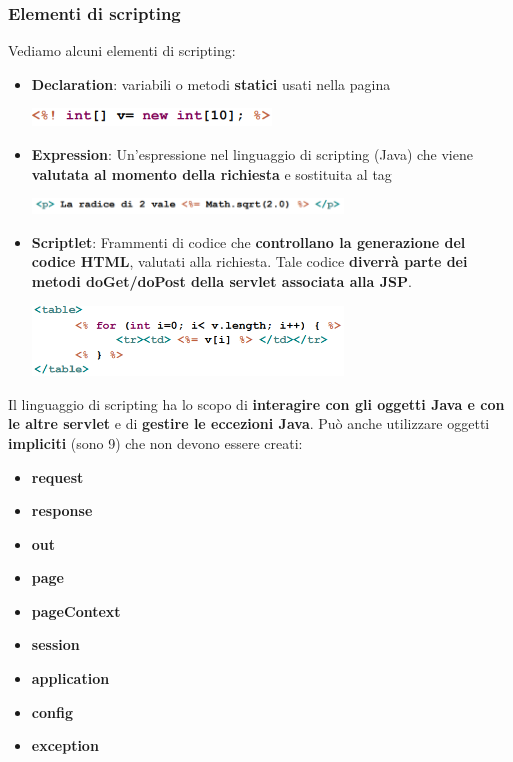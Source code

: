 \documentclass[12pt]{article}
\begin{document}
\subsubsection{Elementi di scripting}
Vediamo alcuni elementi di scripting:
\begin{itemize}
    \item \textbf{Declaration}: variabili o metodi \textbf{statici} usati nella pagina
    \begin{center}
        \includegraphics[width = 0.50\textwidth]{Images/199.png}
    \end{center}
    \item \textbf{Expression}: Un'espressione nel linguaggio di scripting (Java) che viene \textbf{valutata al momento della richiesta} e sostituita al tag
    \begin{center}
        \includegraphics[width = 0.65\textwidth]{Images/200.png}
    \end{center}
    \item \textbf{Scriptlet}: Frammenti di codice che \textbf{controllano la generazione del codice HTML}, valutati alla richiesta. Tale codice \textbf{diverrà parte dei metodi doGet/doPost della servlet associata alla JSP}.
    \begin{center}
        \includegraphics[width = 0.65\textwidth]{Images/201.png}
    \end{center}
\end{itemize}
Il linguaggio di scripting ha lo scopo di \textbf{interagire con gli oggetti Java e con le altre servlet} e di \textbf{gestire le eccezioni Java}.
Può anche utilizzare oggetti \textbf{impliciti} (sono 9) che non devono essere creati:
\begin{itemize}
    \item \textbf{request}
    \item \textbf{response}
    \item \textbf{out}
    \item \textbf{page}
    \item \textbf{pageContext}
    \item \textbf{session}
    \item \textbf{application}
    \item \textbf{config}
    \item \textbf{exception}
\end{itemize}
\end{document}
